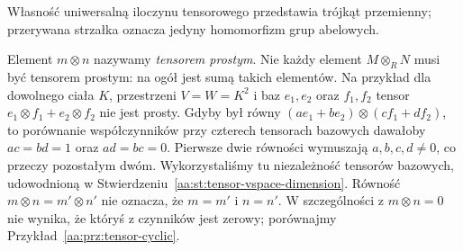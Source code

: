 Własność uniwersalną iloczynu tensorowego przedstawia trójkąt przemienny; przerywana strzałka oznacza jedyny homomorfizm grup abelowych.
\begin{center}
\end{center}


\begin{uwaga}
Element $m\otimes n$ nazywamy \emph{tensorem prostym}.
Nie każdy element $M\otimes_RN$ musi być tensorem prostym:
na ogół jest sumą takich elementów. Na przykład dla dowolnego ciała $K$, przestrzeni
$V=W=K^2$ i baz $e_1,e_2$ oraz $f_1,f_2$ tensor
$e_1\otimes f_1+e_2\otimes f_2$ nie jest prosty.
Gdyby był równy $(ae_1+be_2)\otimes(cf_1+df_2)$,
to porównanie współczynników przy czterech tensorach
bazowych dawałoby $ac=bd=1$ oraz $ad=bc=0$.
Pierwsze dwie równości wymuszają $a,b,c,d\ne0$,
co przeczy pozostałym dwóm. Wykorzystaliśmy tu
niezależność tensorów bazowych, udowodnioną
w Stwierdzeniu~\ref{aa:st:tensor-vspace-dimension}.
Równość $m\otimes n=m'\otimes n'$ nie oznacza, że
$m=m'$ i $n=n'$. W szczególności z $m\otimes n=0$
nie wynika, że któryś z czynników jest zerowy;
porównajmy Przykład~\ref{aa:prz:tensor-cyclic}.
\end{uwaga}

